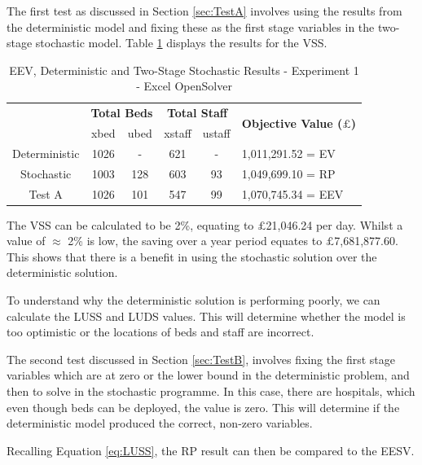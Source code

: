 \documentclass[../thesis.tex]{subfiles}
\begin{document}
The first test as discussed in Section \ref{sec:TestA} involves using the results from the deterministic model and fixing these as the first stage variables in the two-stage stochastic model. Table \ref{tab:eevdettwostageresults1} displays the results for the VSS. 

\begin{table}[h!]
    \centering
    \begin{tabular}{cccccl}\toprule
 & \multicolumn{2}{l}{\textbf{Total Beds}} & \multicolumn{2}{c}{\textbf{Total Staff}} & \multirow{2}{*}{\textbf{Objective Value ($\pounds$)}}\\ \cmidrule(lr){2-3} \cmidrule(lr){4-5}
 & xbed           & ubed          & xstaff         & ustaff         \\ \midrule
      Deterministic & 1026 & - &  621 & - & 1,011,291.52 =  EV \\ \midrule
      Stochastic & 1003 & 128  & 603 & 93 & 1,049,699.10 = RP\\ \midrule
      Test A & 1026 & 101 & 547&  99 &  1,070,745.34 = EEV \\\bottomrule
    \end{tabular}
    \caption{EEV, Deterministic and Two-Stage Stochastic Results - Experiment 1 - Excel OpenSolver}
    \label{tab:eevdettwostageresults1}
\end{table}

The VSS can be calculated to be 2\%, equating to $\pounds$21,046.24 per day. Whilst a value of $\approx$ 2\% is low, the saving over a year period equates to $\pounds$7,681,877.60. This shows that there is a benefit in using the stochastic solution over the deterministic solution.

To understand why the deterministic solution is performing poorly, we can calculate the LUSS and LUDS values. This will determine whether the model is too optimistic or the locations of beds and staff are incorrect.



The second test discussed in Section \ref{sec:TestB}, involves fixing the first stage variables which are at zero or the lower bound in the deterministic problem, and then to solve in the stochastic programme. In this case, there are hospitals, which even though beds can be deployed, the value is zero. This will determine if the deterministic model produced the correct, non-zero variables.

Recalling Equation \eqref{eq:LUSS}, the RP result can then be compared to the EESV.
\end{document}
